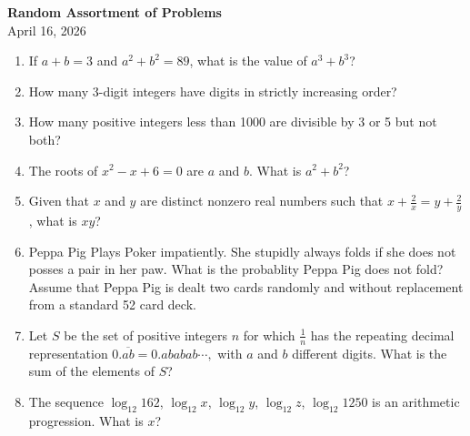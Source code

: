\documentclass[a4paper]{article}
\begin{document}
\begin{center}
{\Large\bfseries Random Assortment of Problems}\\[0.25cm]
{\large April 16, 2026}\\[1cm]
\end{center}

\vspace{.5cm}

\begin{enumerate}[itemsep=2cm]
    \item If $a+b=3$ and $a^2+b^2=89$, what is the value of $a^3+b^3$?
    \item How many 3-digit integers have digits in strictly increasing order?
    \item How many positive integers less than 1000 are divisible by 3 or 5 but not both?
    \item The roots of $x^2 - x + 6 = 0$ are $a$ and $b$. What is $a^2 + b^2$?
    \item Given that $x$ and $y$ are distinct nonzero real numbers such that $x+\tfrac{2}{x} = y + \tfrac{2}{y}$, what is $xy$? 
    \item Peppa Pig Plays Poker impatiently. She stupidly always folds if she does not posses a pair in her paw. What is the probablity Peppa Pig does not fold? Assume that Peppa Pig is dealt two cards randomly and without replacement from a standard 52 card deck.
    \item Let $S$ be the set of positive integers $n$ for which $\tfrac{1}{n}$ has the repeating decimal representation $0.\overline{ab} = 0.ababab\cdots,$ with $a$ and $b$ different digits. What is the sum of the elements of $S$? 
    \item The sequence $\log_{12}{162}$, $\log_{12}{x}$, $\log_{12}{y}$, $\log_{12}{z}$, $\log_{12}{1250}$ is an arithmetic progression. What is $x$? 
\end{enumerate}
\end{document}
